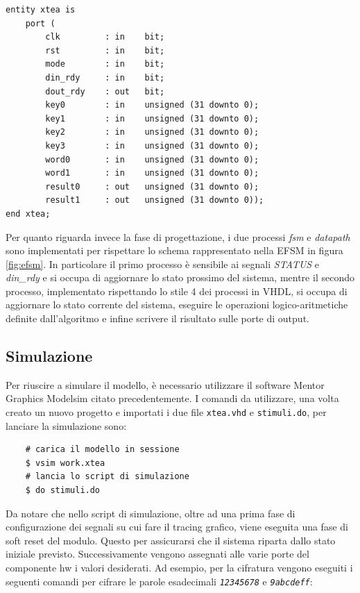 \documentclass[]{IEEEtran}
\newcommand{\signal}[1]{\textit{#1}}
\newcommand{\code}[1]{\texttt{#1}}
\begin{document}
\begin{verbatim}
entity xtea is
	port (
		clk         : in    bit;
		rst         : in    bit;
		mode        : in    bit;
		din_rdy     : in    bit;
		dout_rdy    : out   bit;
		key0        : in    unsigned (31 downto 0);
		key1        : in    unsigned (31 downto 0);
		key2        : in    unsigned (31 downto 0);
		key3        : in    unsigned (31 downto 0);
		word0       : in    unsigned (31 downto 0);
		word1       : in    unsigned (31 downto 0);
		result0     : out   unsigned (31 downto 0);
		result1     : out   unsigned (31 downto 0));
end xtea;
\end{verbatim}
Per quanto riguarda invece la fase di progettazione, i due processi \emph{fsm} e \emph{datapath} sono implementati per
rispettare lo schema rappresentato nella EFSM in figura \ref{fig:efsm}. In particolare il primo processo \`e sensibile 
ai segnali \signal{STATUS} e \signal{din\_rdy} e si occupa di aggiornare lo stato prossimo del sistema, mentre il secondo
processo, implementato rispettando lo stile 4 dei processi in VHDL, si occupa di aggiornare lo stato corrente del 
sistema, eseguire le operazioni logico-aritmetiche definite dall'algoritmo e infine scrivere il risultato sulle porte 
di output.

\subsection{Simulazione}
Per riuscire a simulare il modello, \`e necessario utilizzare il software Mentor Graphics Modelsim citato precedentemente.
I comandi da utilizzare, una volta creato un nuovo progetto e importati i due file \code{xtea.vhd} e \code{stimuli.do},
per lanciare la simulazione sono:

\begin{verbatim}
	# carica il modello in sessione
	$ vsim work.xtea		
	# lancia lo script di simulazione
	$ do stimuli.do		
\end{verbatim}
Da notare che nello script di simulazione, oltre ad una prima fase di configurazione dei segnali su cui fare il tracing
grafico, viene eseguita una fase di soft reset del modulo. Questo per assicurarsi che il sistema riparta dallo stato 
iniziale previsto. Successivamente vengono assegnati alle varie porte del componente hw i valori desiderati. Ad esempio, 
per la cifratura vengono eseguiti i seguenti comandi per cifrare le parole esadecimali \emph{\code{12345678}} e 
\emph{\code{9abcdeff}}:
\end{document}
